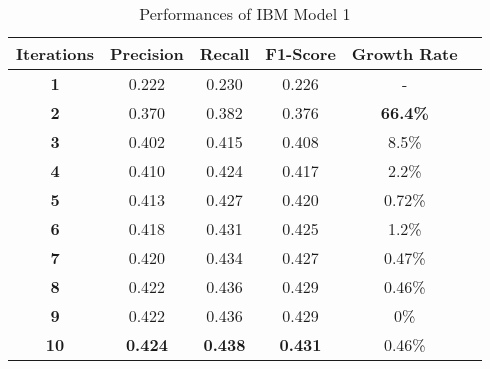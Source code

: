 \begin{table}[ht]  %
\centering  %
\caption{Performances of IBM Model 1}
\begin{tabular}{cccccc}
\hline
\textbf{Iterations} &    \textbf{Precision} & \textbf{Recall} & \textbf{F1-Score} & \textbf{Growth Rate}  \\
\hline
 \textbf{1} & 0.222 & 0.230 & 0.226 & - \\
 \hline
 \textbf{2} & 0.370 & 0.382 & 0.376 & \textbf{66.4\%}\\
 \hline
 \textbf{3} & 0.402 & 0.415 & 0.408 & 8.5\%\\
 \hline
 \textbf{4} & 0.410 & 0.424 & 0.417 & 2.2\%\\
\hline
 \textbf{5} & 0.413 & 0.427 & 0.420 & 0.72\%\\
 \hline
 \textbf{6} & 0.418 & 0.431 & 0.425 &  1.2\%\\
 \hline
 \textbf{7} & 0.420 & 0.434 & 0.427 & 0.47\%\\
 \hline
 \textbf{8} & 0.422 & 0.436 & 0.429 & 0.46\%\\
 \hline
 \textbf{9} & 0.422 & 0.436 & 0.429 & 0\%\\
 \hline
 \textbf{10} & \textbf{0.424} & \textbf{0.438} & \textbf{0.431} & 0.46\%\\
\hline
\end{tabular}
\label{tab:ibm1iter}
\end{table}

